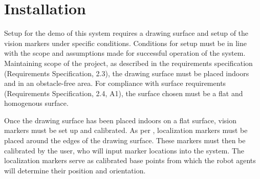 
\section{Installation}
\label{sec:install}
Setup for the demo of this system requires a drawing surface and setup of the vision markers under specific conditions. Conditions for setup must be in line with the scope and assumptions made for successful operation of the system. Maintaining scope of the project, as described in the requirements specification (Requirements Specification, 2.3), the drawing surface must be placed indoors and in an obstacle-free area. For compliance with surface requirements (Requirements Specification, 2.4, A1), the surface chosen must be a flat and homogenous surface.

Once the drawing surface has been placed indoors on a flat surface, vision markers must be set up and calibrated. As per , localization markers must be placed around the edges of the drawing surface. These markers must then be calibrated by the user, who will input marker locations into the system. The localization markers serve as calibrated base points from which the robot agents will determine their position and orientation.
